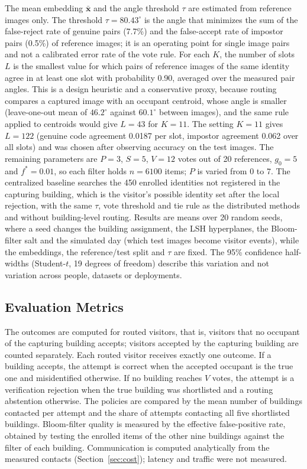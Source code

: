 \documentclass[pdflatex,sn-mathphys-num]{sn-jnl}%
\theoremstyle{thmstyleone}%
\theoremstyle{thmstyletwo}%
\theoremstyle{thmstylethree}%
\begin{document}
The mean embedding $\bar{\mathbf{x}}$ and the angle threshold $\tau$ are estimated from reference images only. The threshold $\tau=80.43^{\circ}$ is the angle that minimizes the sum of the false-reject rate of genuine pairs (7.7\%) and the false-accept rate of impostor pairs (0.5\%) of reference images; it is an operating point for single image pairs and not a calibrated error rate of the vote rule. For each $K$, the number of slots $L$ is the smallest value for which pairs of reference images of the same identity agree in at least one slot with probability 0.90, averaged over the measured pair angles. This is a design heuristic and a conservative proxy, because routing compares a captured image with an occupant centroid, whose angle is smaller (leave-one-out mean of $46.2^{\circ}$ against $60.1^{\circ}$ between images), and the same rule applied to centroids would give $L=43$ for $K=11$. The setting $K=11$ gives $L=122$ (genuine code agreement 0.0187 per slot, impostor agreement 0.062 over all slots) and was chosen after observing accuracy on the test images. The remaining parameters are $P=3$, $S=5$, $V=12$ votes out of 20 references, $g_0=5$ and $f^*=0.01$, so each filter holds $n=6100$ items; $P$ is varied from 0 to 7. The centralized baseline searches the 450 enrolled identities not registered in the capturing building, which is the visitor's possible identity set after the local rejection, with the same $\tau$, vote threshold and tie rule as the distributed methods and without building-level routing. Results are means over 20 random seeds, where a seed changes the building assignment, the LSH hyperplanes, the Bloom-filter salt and the simulated day (which test images become visitor events), while the embeddings, the reference/test split and $\tau$ are fixed. The 95\% confidence half-widths (Student-$t$, 19 degrees of freedom) describe this variation and not variation across people, datasets or deployments.

\subsection{Evaluation Metrics}

The outcomes are computed for routed visitors, that is, visitors that no occupant of the capturing building accepts; visitors accepted by the capturing building are counted separately. Each routed visitor receives exactly one outcome. If a building accepts, the attempt is correct when the accepted occupant is the true one and misidentified otherwise. If no building reaches $V$ votes, the attempt is a verification rejection when the true building was shortlisted and a routing abstention otherwise. The policies are compared by the mean number of buildings contacted per attempt and the share of attempts contacting all five shortlisted buildings. Bloom-filter quality is measured by the effective false-positive rate, obtained by testing the enrolled items of the other nine buildings against the filter of each building. Communication is computed analytically from the measured contacts (Section~\ref{sec:cost}); latency and traffic were not measured.
\end{document}
